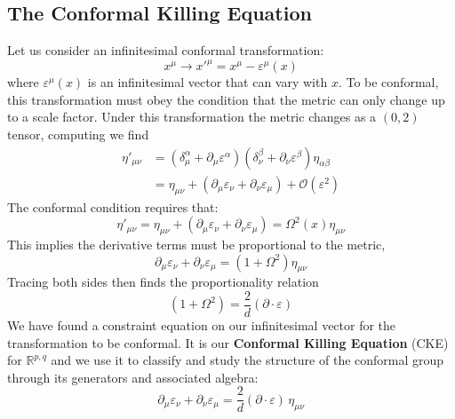 \documentclass{article}
\begin{document}
\subsection{The Conformal Killing Equation}
Let us consider an infinitesimal conformal transformation: 
\begin{equation}
    x^\mu \longrightarrow x'^\mu = x^\mu - \varepsilon^\mu(x)
\end{equation}
where $\varepsilon^\mu(x)$ is an infinitesimal vector that can vary with $x$. To be conformal, this transformation must obey the condition that the metric can only change up to a scale factor. Under this transformation the metric changes as a $(0,2)$ tensor, computing we find
\begin{align}
\eta'_{\mu\nu}
&=
(\delta^\alpha_\mu + \partial_\mu \varepsilon^\alpha)
(\delta^\beta_\nu + \partial_\nu \varepsilon^\beta)
\eta_{\alpha\beta}
\\
&=
\eta_{\mu\nu}
+ (\partial_\mu \varepsilon_\nu
+ \partial_\nu \varepsilon_\mu)
+ \mathcal{O}(\varepsilon^2)
\end{align}
The conformal condition requires that: 
\begin{equation}
    \eta'_{\mu\nu} = \eta_{\mu\nu} + (\partial_\mu \varepsilon_\nu
+ \partial_\nu \varepsilon_\mu) = \Omega^2(x) \eta_{\mu\nu}
\end{equation}
This implies the derivative terms must be proportional to the metric,
\begin{equation}
    \partial_\mu \varepsilon_\nu
+ \partial_\nu \varepsilon_\mu = (1+\Omega^2)\eta_{\mu\nu}
\end{equation}
Tracing both sides then finds the proportionality relation
\begin{equation}
     (1+\Omega^2) = \frac{2}{d} (\partial\cdot\varepsilon)
\end{equation}
We have found a constraint equation on our infinitesimal vector for the transformation to be conformal. It is our \textbf{Conformal Killing Equation} (CKE) for $\mathds{R}^{p,q}$ and we use it to classify and study the structure of the conformal group through its generators and associated algebra: 
\begin{equation}
\boxed{
\partial_\mu \varepsilon_\nu
+ \partial_\nu \varepsilon_\mu
= \frac{2}{d}(\partial \cdot \varepsilon)\,\eta_{\mu\nu}
}
\end{equation}
\end{document}
